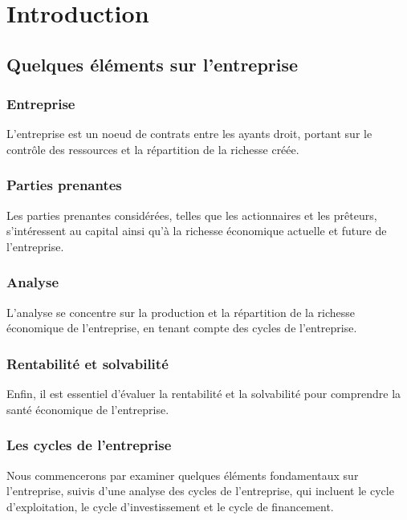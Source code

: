 \documentclass[a4paper, 12pt]{report}
\begin{document}
\chapter*{Introduction}
	
\section{Quelques éléments sur l'entreprise}

\subsection{Entreprise}

L'entreprise est un noeud de contrats entre les ayants droit, portant sur le contrôle des ressources et la répartition de la richesse créée. 

\subsection{Parties prenantes}

Les parties prenantes considérées, telles que les actionnaires et les prêteurs, s'intéressent au capital ainsi qu'à la richesse économique actuelle et future de l'entreprise.

\subsection{Analyse}

L'analyse se concentre sur la production et la répartition de la richesse économique de l'entreprise, en tenant compte des cycles de l'entreprise.

\subsection{Rentabilité et solvabilité}

Enfin, il est essentiel d'évaluer la rentabilité et la solvabilité pour comprendre la santé économique de l'entreprise.
	
\subsection{Les cycles de l'entreprise}

Nous commencerons par examiner quelques éléments fondamentaux sur l'entreprise, suivis d'une analyse des cycles de l'entreprise, qui incluent le cycle d'exploitation, le cycle d'investissement et le cycle de financement.
\end{document}
